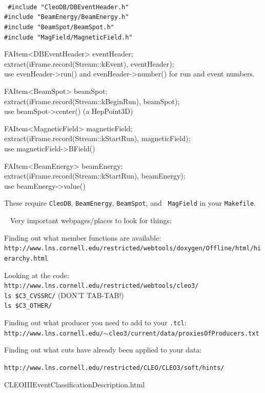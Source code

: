 \documentclass[landscape]{article}
\newenvironment{slide}{\mbox{ }\vfill}{\vfill \mbox{ } \pagebreak}
\begin{document}
\begin{slide}
\huge {\tt
\#include "CleoDB/DBEventHeader.h" \\
\#include "BeamEnergy/BeamEnergy.h" \\
\#include "BeamSpot/BeamSpot.h" \\
\#include "MagField/MagneticField.h"

\vspace{0.45 cm}
FAItem<DBEventHeader> eventHeader; \\
extract(iFrame.record(Stream::kEvent), eventHeader); \\
{\rm use} evenHeader->run() {\rm and} evenHeader->number() {\rm for
run and event numbers.}

\vspace{0.45 cm}
FAItem<BeamSpot> beamSpot; \\
extract(iFrame.record(Stream::kBeginRun), beamSpot); \\
{\rm use} beamSpot->center() {\rm (a HepPoint3D)}

\vspace{0.45 cm}
FAItem<MagneticField> magneticField; \\
extract(iFrame.record(Stream::kStartRun), magneticField); \\
{\rm use} magneticField->BField()

\vspace{0.45 cm}
FAItem<BeamEnergy> beamEnergy; \\
extract(iFrame.record(Stream::kStartRun), beamEnergy); \\
{\rm use} beamEnergy->value()}

\vspace{0.45 cm}
These require {\tt CleoDB}, {\tt BeamEnergy}, {\tt BeamSpot}, and {\tt
MagField} in your {\tt Makefile}.
\end{slide}

\begin{slide}
Very important webpages/places to look for things:

\vfill
Finding out what member functions are available: \\
{\tt \LARGE http://www.lns.cornell.edu/restricted/webtools/doxygen/Offline/html/hierarchy.html}

\vfill
Looking at the code: \\
{\tt \LARGE http://www.lns.cornell.edu/restricted/webtools/cleo3/} \\
{\tt \LARGE ls \$C3\_CVSSRC/} (DON'T TAB-TAB!) \\
{\tt \LARGE ls \$C3\_OTHER/}

\vfill
Finding out what producer you need to add to your {\tt .tcl}: \\
{\tt \LARGE http://www.lns.cornell.edu/$\sim$cleo3/current/data/proxiesOfProducers.txt}

\vfill
Finding out what cuts have already been applied to your data: \\
{\tt \LARGE http://www.lns.cornell.edu/restricted/CLEO/CLEO3/soft/hints/
\begin{flushright} CLEOIIIEventClassificationDescription.html \end{flushright}}

\end{slide}
\end{document}
